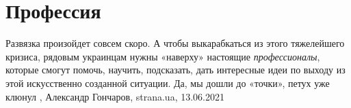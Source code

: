  
 
 
 
 
\chapter{Профессия}
\label{sec:slova.professia}

Развязка произойдет совсем скоро. А чтобы выкарабкаться из этого тяжелейшего
кризиса, рядовым украинцам нужны «наверху» настоящие \emph{профессионалы}, которые
смогут помочь, научить, подсказать, дать интересные идеи по выходу из этой
искусственно созданной ситуации. Да, мы дошли до «точки», петух уже клюнул
, 
Александр Гончаров, strana.ua, 13.06.2021

